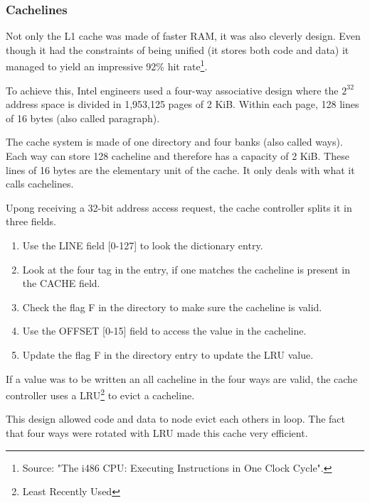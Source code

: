 \subsubsection{Cachelines}
Not only the L1 cache was made of faster RAM, it was also cleverly design. Even though it had the constraints of being unified (it stores both code and data) it managed to yield an impressive 92\% hit rate\footnote{Source: "The i486 CPU: Executing Instructions in One Clock Cycle".}.\\
\par
To achieve this, Intel engineers used a four-way associative design where the $2^{32}$ address space is divided in 1,953,125 pages of 2 KiB. Within each page, 128 lines of 16 bytes (also called paragraph).\\
\par
{}
\par
The cache system is made of one directory and four banks (also called ways). Each way can store 128 cacheline and therefore has a capacity of 2 KiB. These lines of 16 bytes are the elementary unit of the cache. It only deals with what it calls cachelines.\\
\par
Upong receiving a 32-bit address access request, the cache controller splits it in three fields.
\begin{enumerate}
\item Use the LINE field [0-127] to look the dictionary entry.
\item Look at the four tag in the entry, if one matches the cacheline is present in the CACHE field.
\item Check the flag F in the directory to make sure the cacheline is valid.
\item Use the OFFSET [0-15] field to access the value in the cacheline.
\item Update the flag F in the directory entry to update the LRU value.
\end{enumerate}
\par
If a value was to be written an all cacheline in the four ways are valid, the cache controller uses a LRU\footnote{Least Recently Used} to evict a cacheline.\\
\par
{}
This design allowed code and data to node evict each others in loop. The fact that four ways were rotated with LRU made this cache very efficient.\\
\par
{}





